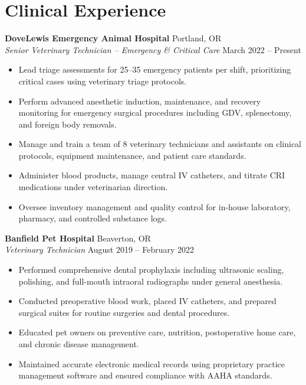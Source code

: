 \documentclass[10pt,letterpaper]{article}
\begin{document}
\vspace{2.5mm}

\section*{Clinical Experience}

\textbf{DoveLewis Emergency Animal Hospital} \hfill Portland, OR \\
\textit{Senior Veterinary Technician -- Emergency \& Critical Care} \hfill March 2022 -- Present
\vspace{1mm}
\begin{itemize}[leftmargin=*,noitemsep,topsep=1pt,parsep=0pt,partopsep=0pt]
    \item Lead triage assessments for 25--35 emergency patients per shift, prioritizing critical cases using veterinary triage protocols.
    \item Perform advanced anesthetic induction, maintenance, and recovery monitoring for emergency surgical procedures including GDV, splenectomy, and foreign body removals.
    \item Manage and train a team of 8 veterinary technicians and assistants on clinical protocols, equipment maintenance, and patient care standards.
    \item Administer blood products, manage central IV catheters, and titrate CRI medications under veterinarian direction.
    \item Oversee inventory management and quality control for in-house laboratory, pharmacy, and controlled substance logs.
\end{itemize}

\vspace{2mm}

\textbf{Banfield Pet Hospital} \hfill Beaverton, OR \\
\textit{Veterinary Technician} \hfill August 2019 -- February 2022
\vspace{1mm}
\begin{itemize}[leftmargin=*,noitemsep,topsep=1pt,parsep=0pt,partopsep=0pt]
    \item Performed comprehensive dental prophylaxis including ultrasonic scaling, polishing, and full-mouth intraoral radiographs under general anesthesia.
    \item Conducted preoperative blood work, placed IV catheters, and prepared surgical suites for routine surgeries and dental procedures.
    \item Educated pet owners on preventive care, nutrition, postoperative home care, and chronic disease management.
    \item Maintained accurate electronic medical records using proprietary practice management software and ensured compliance with AAHA standards.
\end{itemize}
\end{document}
